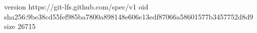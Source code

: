 version https://git-lfs.github.com/spec/v1
oid sha256:9be38cd55fef985ba7800a898148e606e13edf87066a58601577b3457752d8d9
size 26715
